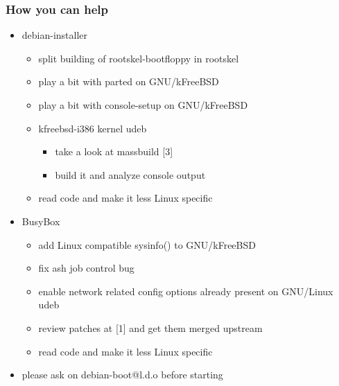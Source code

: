 \documentclass{beamer}
\begin{document}
\begin{frame}
  \frametitle{How you can help}

  \begin{itemize}
  \item
    debian-installer
    \begin{itemize}
    \item
      split building of rootskel-bootfloppy in rootskel
    \item
      play a bit with parted on GNU/kFreeBSD
    \item
      play a bit with console-setup on GNU/kFreeBSD
    \item
      kfreebsd-i386 kernel udeb
      \begin{itemize}
      \item
        take a look at massbuild [3]
      \item
        build it and analyze console output
      \end{itemize}
    \item
      read code and make it less Linux specific
    \end{itemize}
  \item
    BusyBox
    \begin{itemize}
    \item
      add Linux compatible sysinfo() to GNU/kFreeBSD
    \item
      fix ash job control bug
    \item
      enable network related config options already present on GNU/Linux udeb
    \item
      review patches at [1] and get them merged upstream
    \item
      read code and make it less Linux specific
    \end{itemize}
  \end{itemize}

  \begin{itemize}
  \item
    please ask on debian-boot@l.d.o before starting
  \end{itemize}

\end{frame}
\end{document}
